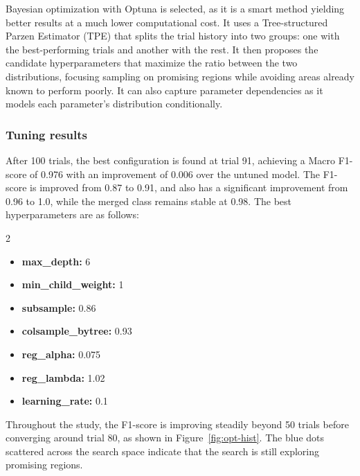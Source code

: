 \vspace{-0.5cm}
Bayesian optimization with Optuna is selected, as it is a smart method yielding better results at a much lower computational cost. It uses a Tree-structured Parzen Estimator (TPE) that splits the trial history into two groups: one with the best-performing trials and another with the rest. It then proposes the candidate hyperparameters that maximize the ratio between the two distributions, focusing sampling on promising regions while avoiding areas already known to perform poorly. It can also capture parameter dependencies as it models each parameter's distribution conditionally.
\vspace{-0.4cm}

\subsubsection{Tuning results}
\vspace{-0.2cm}

After 100 trials, the best configuration is found at trial 91, achieving a Macro F1-score of 0.976 with an improvement of 0.006 over the untuned model. The  F1-score is improved from 0.87 to 0.91, and  also has a significant improvement from 0.96 to 1.0, while the merged  class remains stable at 0.98.
The best hyperparameters are as follows:
\begin{multicols}{2}

    \begin{itemize}
        \item \textbf{max\_depth:} 6
        \item \textbf{min\_child\_weight:} 1
        \item \textbf{subsample:} 0.86
        \item \textbf{colsample\_bytree:} 0.93
        \item \textbf{reg\_alpha:} 0.075
        \item \textbf{reg\_lambda:} 1.02
        \item \textbf{learning\_rate:} 0.1
    \end{itemize}
\end{multicols}

\vspace{-0.5cm}
Throughout the study, the F1-score is improving steadily beyond 50 trials before converging around trial 80, as shown in Figure~\ref{fig:opt-hist}. The blue dots scattered across the search space indicate that the search is still exploring promising regions.


